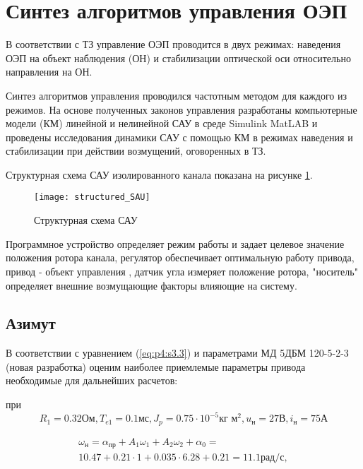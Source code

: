 \section{Синтез алгоритмов управления ОЭП} \label{ch:ch4/sect4-}

В соответствии с ТЗ управление ОЭП проводится в двух режимах:
наведения ОЭП на объект наблюдения (ОН) и стабилизации оптической оси относительно направления на ОН. 

Синтез алгоритмов управления проводился частотным методом \cite[]{Bessekerski} для каждого из режимов. На основе полученных законов управления разработаны компьютерные модели (КМ) линейной и нелинейной САУ в среде Simulink MatLAB и проведены исследования динамики САУ с помощью КМ в режимах наведения и стабилизации при действии возмущений, оговоренных в ТЗ.

Структурная схема САУ изолированного канала показана на рисунке \ref{fig:structured_SAU}.

\begin{figure}[ht]
	\centering
	\texttt{[image: structured\_SAU]}
	\caption{Структурная схема САУ}
	\label{fig:structured_SAU}
\end{figure}

Программное устройство определяет режим работы и задает целевое значение положения ротора канала, регулятор обеспечивает оптимальную работу привода, привод - объект управления , 
датчик угла измеряет положение ротора, "носитель" определяет внешние возмущающие факторы влияющие на систему.

\subsection{Азимут} \label{ch:ch4/sect4-/sub1}

В соответствии с уравнением (\ref{eq:p4:s3.3}) и параметрами МД 5ДБМ 120-5-2-3 (новая разработка) оценим наиболее приемлемые параметры привода необходимые для дальнейших расчетов:

при 
\[  R_1 = 0.32 \textit{Ом}, 
T_{e1} = 0.1 \textit{мс}, 
J_p = 0.75 \cdot 10^{-5} \textit{кг м}^2,  
u_\textit{н} = 27 \textit{В},
i_\textit{н} = 75 \textit{А} \]


\begin{equation}
\label{eq:p4:sec4/1}
\begin{multlined}
\omega _{\textit{н}}=
\alpha _{\textit{пр}} + A_{1} \omega _{1} + A_{2} \omega _{2} + \alpha _{0} =\\
10.47 + 0.21 \cdot 1 + 0.035 \cdot 6.28 + 0.21 = 11.1 \textit{рад/с},
\end{multlined}
\end{equation}

